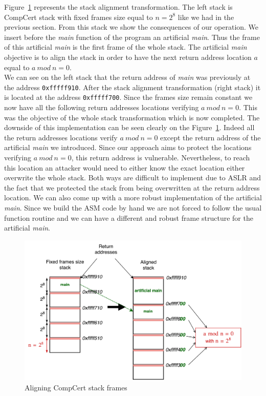 \documentclass[11pt]{sdm}
\begin{document}
Figure~\ref{stack_align} represents the stack alignment transformation. The left stack is CompCert stack with fixed frames size equal to $n=2^8$ like we had in the previous section. From this stack we show the consequences of our operation. We insert before the \textit{main} function of the program an artificial \textit{main}. Thus the frame of this artificial \textit{main} is the first frame of the whole stack. The artificial \textit{main} objective is to align the stack in order to have the next return address location $a$ equal to $a~mod~n=0$. \\
We can see on the left stack that the return address of \textit{main} was previously at the address \texttt{0xfffff910}. After the stack alignment transformation (right stack) it is located at the address \texttt{0xfffff700}. Since the frames size remain constant we now have all the following return addresses locations verifying $a~mod~n=0$. This was the objective of the whole stack transformation which is now completed.
The downside of this implementation can be seen clearly on the Figure~\ref{stack_align}. Indeed all the return addresses locations verify $a~mod~n=0$ except the return address of the artificial \textit{main} we introduced.
Since our approach aims to protect the locations verifying $a~mod~n=0$, this return address is vulnerable.
Nevertheless, to reach this location an attacker would need to either know the exact location either overwrite the whole stack. Both ways are difficult to implement due to ASLR and the fact that we protected the stack from being overwritten at the return address location. We can also come up with a more robust implementation of the artificial \textit{main}. Since we build the ASM code by hand we are not forced to follow the usual function routine and we can have a different and robust frame structure for the artificial \textit{main}.

\begin{figure}[!ht]
\centering
\includegraphics[scale=0.6]{images/stack_align.pdf}
\caption{Aligning CompCert stack frames}
\label{stack_align}
\end{figure}
\end{document}
